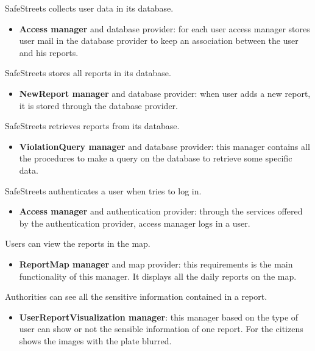 \documentclass[../RASD.tex]{subfiles}
\begin{document}
\begin{enumerate}
         SafeStreets collects user data in its database.
        \begin{itemize}
            \item \textbf{Access manager} and database provider: for each user access manager stores user mail in the database provider
            to keep an association between the user and his reports.
        \end{itemize}

         SafeStreets stores all reports in its database.
        \begin{itemize}
            \item \textbf{NewReport manager} and database provider: when user adds a new report, it is stored through the database provider.
        \end{itemize}

         SafeStreets retrieves reports from its database.
        \begin{itemize}
            \item \textbf{ViolationQuery manager} and database provider: this manager contains all the procedures to make a query on the database
            to retrieve some specific data.
        \end{itemize}

         SafeStreets authenticates a user when tries to log in.
        \begin{itemize}
            \item \textbf{Access manager} and authentication provider: through the services offered by the authentication provider, access manager logs in a user.
        \end{itemize}

         Users can view the reports in the map.
        \begin{itemize}
            \item \textbf{ReportMap manager} and map provider: this requirements is the main functionality of this manager.
            It displays all the daily reports on the map.
        \end{itemize}


         Authorities can see all the sensitive information contained in a report.
        \begin{itemize}
            \item \textbf{UserReportVisualization manager}: this manager based on the type of user can show or not the sensible information of one report.
            For the citizens shows the images with the plate blurred.
        \end{itemize}


\end{enumerate}
\end{document}
